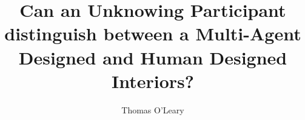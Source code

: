 \documentclass[journal]{IEEEtran}
\begin{document}
\title{Can an Unknowing Participant distinguish between a Multi-Agent Designed and Human Designed Interiors?}

\author{Thomas O'Leary}

\maketitle









%







\end{document}
